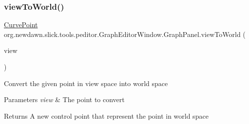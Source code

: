 \subsubsection{\texorpdfstring{view\+To\+World()}{viewToWorld()}}
{\footnotesize\ttfamily \mbox{\hyperlink{classorg_1_1newdawn_1_1slick_1_1tools_1_1peditor_1_1_graph_editor_window_1_1_graph_panel_1_1_curve_point}{Curve\+Point}} org.\+newdawn.\+slick.\+tools.\+peditor.\+Graph\+Editor\+Window.\+Graph\+Panel.\+view\+To\+World (\begin{DoxyParamCaption}\item[{\mbox{\hyperlink{classorg_1_1newdawn_1_1slick_1_1tools_1_1peditor_1_1_graph_editor_window_1_1_graph_panel_1_1_curve_point}{Curve\+Point}}}]{view }\end{DoxyParamCaption})\hspace{0.3cm}{\ttfamily [inline]}}

Convert the given point in view space into world space


\begin{DoxyParams}{Parameters}
{\em view} & The point to convert \\
\hline
\end{DoxyParams}
\begin{DoxyReturn}{Returns}
A new control point that represent the point in world space 
\end{DoxyReturn}

